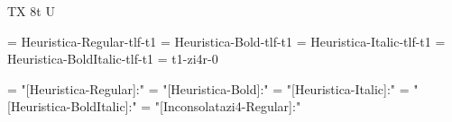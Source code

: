 
\ifx\ffdecl\undefined  \fi

\ffdecl [Heuristica] {\caps} {\rm \bf \it \bi \tt} {} {TX} {8t U}


\ismacro{}\ifttrue

   \font\tenrm = Heuristica-Regular-tlf-t1  \sizespec
   \font\tenbf = Heuristica-Bold-tlf-t1  \sizespec
   \font\tenit = Heuristica-Italic-tlf-t1 \sizespec
   \font\tenbi = Heuristica-BoldItalic-tlf-t1 \sizespec
   \font\tentt = t1-zi4r-0 \sizespec %

   \def\ffnamegen{Heuristica-\ffvarV\capsV-t1}

   \def\caps{\ffvars{Regular}{!}{!}{!}\ffsetV{caps}{-tosf-sc}\ffsetX}  
   \def\nocaps{\ffsetX}
   \nocaps\relax

\fi

\ismacro{}\iftrue

   \font\tenrm = "[Heuristica-Regular]:\fontfeatures"    \sizespec
   \font\tenbf = "[Heuristica-Bold]:\fontfeatures"       \sizespec
   \font\tenit = "[Heuristica-Italic]:\fontfeatures"     \sizespec
   \font\tenbi = "[Heuristica-BoldItalic]:\fontfeatures" \sizespec
   \font\tentt = "[Inconsolatazi4-Regular]:\fontfeatures" \sizespec

   \def\ffnamegen{"[Heuristica-\ffvarV]:\capsV\fontfeatures"} 

   \def\caps{\ffsetV{caps}{+smcp;+onum;}\ffsetX}
   \def\nocaps{\ffsetX}
   \nocaps\relax

\fi
\tenrm %

\def\narrow{\cond\fam}

\ifx\loadmathfonts\relax \endinput \fi
\ifx\mathpreloaded X\else  \fi                     

